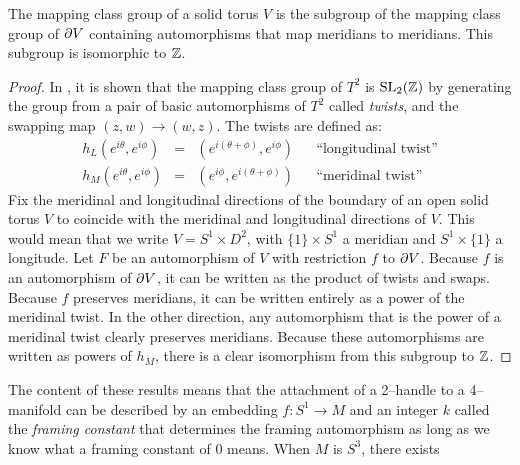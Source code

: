 \begin{theorem}
	The mapping class group of a solid torus $V$ is the subgroup of the mapping class group of $\partial V$ containing automorphisms that map meridians to meridians.
	This subgroup is isomorphic to $\mathbb{Z}$.	
\end{theorem}

\begin{proof}
	In \cite{Rolf76}, it is shown that the mapping class group of $T^2$ is $\textrm{SL}_2(\mathbb{Z})$ by generating the group from a pair of basic automorphisms of $T^2$ called \emph{twists}, and the swapping map $(z,w)\to(w,z)$.
	The twists are defined as:
	\[
	\begin{array}{ccccc}
	h_L(e^{i\theta},e^{i\phi}) & = & (e^{i(\theta+\phi)},e^{i\phi}) & & \textrm{``longitudinal twist''} \\
	
	h_M(e^{i\theta},e^{i\phi}) & = & (e^{i\phi},e^{i(\theta+\phi)}) & & \textrm{``meridinal twist''}	
	\end{array}
	\]
	Fix the meridinal and longitudinal directions of the boundary of an open solid torus $V$ to coincide with the meridinal and longitudinal directions of $V$.
	This would mean that we write $V=S^1\times D^2$, with $\{1\}\times S^1$ a meridian and $S^1\times\{1\}$ a longitude.
	Let $F$ be an automorphism of $V$ with restriction $f$ to $\partial V$.
	Because $f$ is an automorphism of $\partial V$, it can be written as the product of twists and swaps.
	Because $f$ preserves meridians, it can be written entirely as a power of the meridinal twist.
	In the other direction, any automorphism that is the power of a meridinal twist clearly preserves meridians.
	Because these automorphisms are written as powers of $h_M$, there is a clear isomorphism from this subgroup to $\mathbb{Z}$.
\end{proof}

The content of these results means that the attachment of a 2--handle to a 4--manifold can be described by an embedding $f:S^1\to M$ and an integer $k$ called the \emph{framing constant} that determines the framing automorphism as long as we know what a framing constant of $0$ means.
When $M$ is $S^3$, there exists 